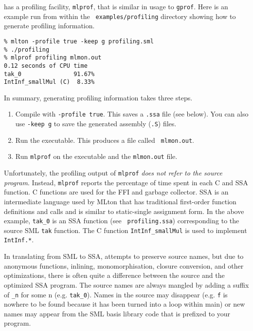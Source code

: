 
{\mlton} has a profiling facility, {\tt mlprof}, that is similar in
usage to {\tt gprof}.  Here is an example run from within the {\tt
  examples/profiling} directory showing how to generate profiling
information.

\begin{verbatim}
% mlton -profile true -keep g profiling.sml
% ./profiling
% mlprof profiling mlmon.out
0.12 seconds of CPU time
tak_0               91.67%
IntInf_smallMul (C)  8.33%
\end{verbatim}
In summary, generating profiling information takes three steps.
\begin{enumerate}
  
\item Compile with {\tt -profile true}.  This saves a {\tt .ssa} file
  (see below).  You can also use {\tt -keep g} to save the generated
  assembly ({\tt .S}) files.
  
\item Run the executable.  This produces a file called {\tt
    mlmon.out}.
  
\item Run {\tt mlprof} on the executable and the {\tt mlmon.out} file.

\end{enumerate}
Unfortunately, the profiling output of {\tt mlprof} {\em
does not refer to the source program}.  Instead, {\tt mlprof} reports the
percentage of time spent in each C and SSA function.  C functions are
used for the FFI and garbage collector.  SSA is an intermediate
language used by MLton that has traditional first-order function
definitions and calls and is similar to static-single assignment form.
In the above example, {\tt tak\_0} is an SSA function (see {\tt
  profiling.ssa}) corresponding to the source SML {\tt tak} function.
The C function {\tt IntInf\_smallMul} is used to implement {\tt
  IntInf.*}.

In translating from SML to SSA, {\mlton} attempts to preserve source
names, but due to anonymous functions, inlining, monomorphisation,
closure conversion, and other optimizations, there is often quite a
difference between the source and the optimized SSA program.  The
source names are always mangled by adding a suffix of {\tt \_n} for
some n (e.g. {\tt tak\_0}).  Names in the source may disappear (e.g.
{\tt f} is nowhere to be found because it has been turned into a loop
within main) or new names may appear from the SML basis library code
that is prefixed to your program.

